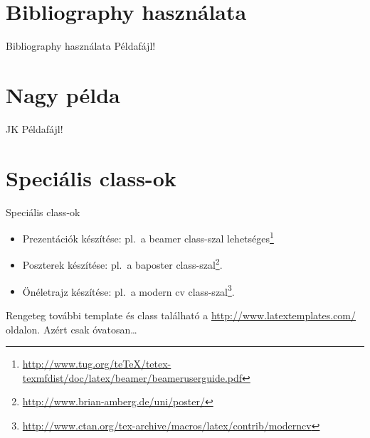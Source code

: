 \documentclass{beamer} %
\begin{document}
\section{Bibliography használata}

\begin{frame}[fragile]{Bibliography használata}
 Példafájl!
\end{frame}

\section{Nagy példa}

\begin{frame}[fragile]{JK}
 Példafájl!
\end{frame}

\section{Speciális class-ok}

\begin{frame}{Speciális class-ok}
 \begin{itemize}
  \item Prezentációk készítése: pl.\ a beamer class-szal lehetséges\footnote{\url{http://www.tug.org/teTeX/tetex-texmfdist/doc/latex/beamer/beameruserguide.pdf}}
  \item Poszterek készítése: pl.\ a baposter class-szal\footnote{\url{http://www.brian-amberg.de/uni/poster/}}.
  \item Önéletrajz készítése: pl.\ a modern cv class-szal\footnote{\url{http://www.ctan.org/tex-archive/macros/latex/contrib/moderncv}}.
 \end{itemize}
 
 Rengeteg további template és class található a \url{http://www.latextemplates.com/} oldalon. Azért csak óvatosan\dots
\end{frame}
\end{document}
